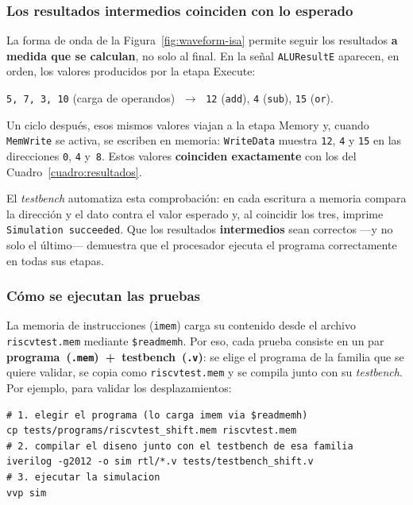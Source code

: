 \documentclass[11pt,a4paper]{article}
\begin{document}
\subsubsection{Los resultados intermedios coinciden con lo esperado}

La forma de onda de la Figura~\ref{fig:waveform-isa} permite seguir los resultados
\textbf{a medida que se calculan}, no solo al final. En la señal \texttt{ALUResultE}
aparecen, en orden, los valores producidos por la etapa Execute:

\begin{center}
	\texttt{5, 7, 3, 10} (carga de operandos) $\;\to\;$
	\texttt{12} (\texttt{add}), \texttt{4} (\texttt{sub}), \texttt{15} (\texttt{or}).
\end{center}

Un ciclo después, esos mismos valores viajan a la etapa Memory y, cuando
\texttt{MemWrite} se activa, se escriben en memoria: \texttt{WriteData} muestra
\texttt{12}, \texttt{4} y \texttt{15} en las direcciones \texttt{0}, \texttt{4}
y~\texttt{8}. Estos valores \textbf{coinciden exactamente} con los del
Cuadro~\ref{cuadro:resultados}.

El \textit{testbench} automatiza esta comprobación: en cada escritura a memoria compara
la dirección y el dato contra el valor esperado y, al coincidir los tres, imprime
\texttt{Simulation succeeded}. Que los resultados \textbf{intermedios} sean correctos
---y no solo el último--- demuestra que el procesador ejecuta el programa
correctamente en todas sus etapas.

\subsubsection{Cómo se ejecutan las pruebas}

La memoria de instrucciones (\texttt{imem}) carga su contenido desde el archivo
\texttt{riscvtest.mem} mediante \texttt{\$readmemh}. Por eso, cada prueba consiste en un
par \textbf{programa~(\texttt{.mem})~+~testbench~(\texttt{.v})}: se elige el programa de
la familia que se quiere validar, se copia como \texttt{riscvtest.mem} y se compila junto
con su \textit{testbench}. Por ejemplo, para validar los desplazamientos:

\begin{lstlisting}[language={}]
# 1. elegir el programa (lo carga imem via $readmemh)
cp tests/programs/riscvtest_shift.mem riscvtest.mem
# 2. compilar el diseno junto con el testbench de esa familia
iverilog -g2012 -o sim rtl/*.v tests/testbench_shift.v
# 3. ejecutar la simulacion
vvp sim
\end{lstlisting}
\end{document}
